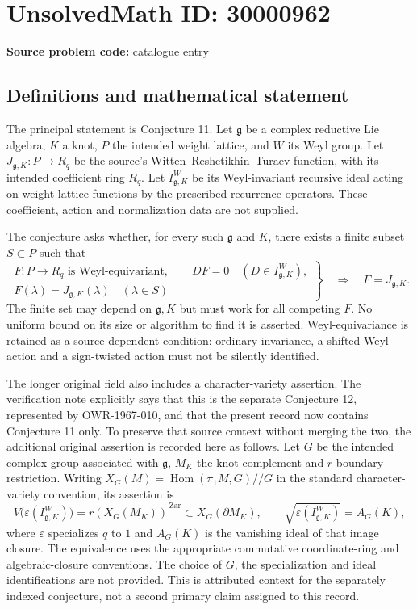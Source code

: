 \documentclass[11pt]{article}
\begin{document}
\section*{UnsolvedMath ID: 30000962}
\textbf{Source problem code:} catalogue entry
\subsection{Definitions and mathematical statement}
The principal statement is Conjecture 11. Let $\mathfrak g$ be a complex reductive Lie algebra, $K$ a knot, $P$ the intended weight lattice, and $W$ its Weyl group. Let $J_{\mathfrak g,K}:P\to R_q$ be the source's Witten--Reshetikhin--Turaev function, with its intended coefficient ring $R_q$. Let $I^W_{\mathfrak g,K}$ be its Weyl-invariant recursive ideal acting on weight-lattice functions by the prescribed recurrence operators. These coefficient, action and normalization data are not supplied.

The conjecture asks whether, for every such $\mathfrak g$ and $K$, there exists a finite subset $S\subset P$ such that
\[
\left.
\begin{gathered}
F:P\to R_q\text{ is Weyl-equivariant},\qquad
D F=0\quad(D\in I^W_{\mathfrak g,K}),\\
F(\lambda)=J_{\mathfrak g,K}(\lambda)\quad(\lambda\in S)
\end{gathered}
\right\}
\quad\Longrightarrow\quad F=J_{\mathfrak g,K}.
\]
The finite set may depend on $\mathfrak g,K$ but must work for all competing $F$. No uniform bound on its size or algorithm to find it is asserted. Weyl-equivariance is retained as a source-dependent condition: ordinary invariance, a shifted Weyl action and a sign-twisted action must not be silently identified.

The longer original field also includes a character-variety assertion. The verification note explicitly says that this is the separate Conjecture 12, represented by OWR-1967-010, and that the present record now contains Conjecture 11 only. To preserve that source context without merging the two, the additional original assertion is recorded here as follows. Let $G$ be the intended complex group associated with $\mathfrak g$, $M_K$ the knot complement and $r$ boundary restriction. Writing $X_G(M)=\operatorname{Hom}(\pi_1M,G)//G$ in the standard character-variety convention, its assertion is
\[
V\bigl(\varepsilon(I^W_{\mathfrak g,K})\bigr)
=\overline{r(X_G(M_K))}^{\,\mathrm{Zar}}
\subset X_G(\partial M_K),\qquad
\sqrt{\varepsilon(I^W_{\mathfrak g,K})}=A_G(K),
\]
where $\varepsilon$ specializes $q$ to $1$ and $A_G(K)$ is the vanishing ideal of that image closure. The equivalence uses the appropriate commutative coordinate-ring and algebraic-closure conventions. The choice of $G$, the specialization and ideal identifications are not provided. This is attributed context for the separately indexed conjecture, not a second primary claim assigned to this record.
\end{document}
